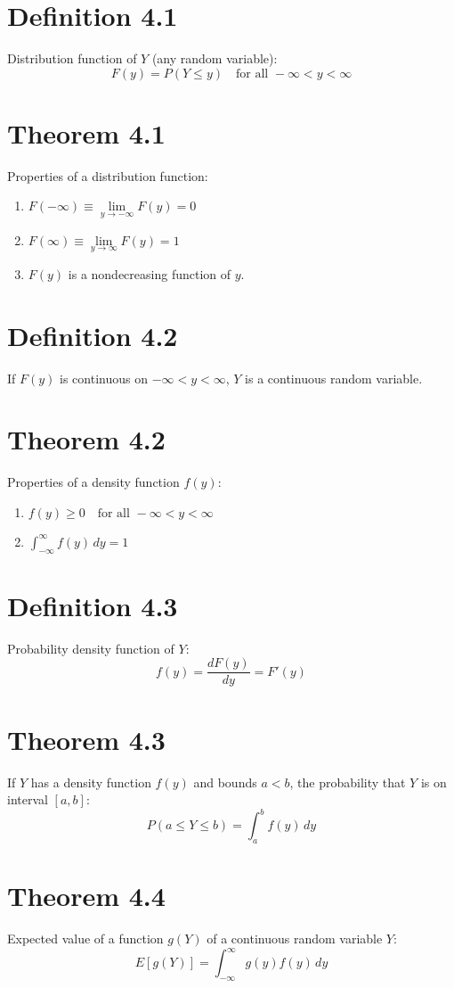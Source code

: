 \documentclass[12pt]{article}
\begin{document}
\section{Definition 4.1}
Distribution function of $Y$ (any random variable):
\[
F(y) = P(Y \leq y) \quad \text{for all } -\infty < y < \infty
\]

\section{Theorem 4.1}
Properties of a distribution function:
\begin{enumerate}
  \item $F(-\infty) \equiv \lim\limits_{y \to -\infty} F(y) = 0$
  \item $F(\infty) \equiv \lim\limits_{y \to \infty} F(y) = 1$
  \item $F(y)$ is a nondecreasing function of $y$.
\end{enumerate}

\section{Definition 4.2}
If $F(y)$ is continuous on $-\infty < y < \infty$, $Y$ is a continuous random variable.

\section{Theorem 4.2}
Properties of a density function $f(y)$:
\begin{enumerate}
  \item $f(y) \geq 0 \quad \text{for all } -\infty < y < \infty$
  \item $\int_{-\infty}^{\infty} f(y)\,dy = 1$
\end{enumerate}

\section{Definition 4.3}
Probability density function of $Y$:
\[
f(y) = \frac{dF(y)}{dy} = F'(y)
\]

\section{Theorem 4.3}
If $Y$ has a density function $f(y)$ and bounds $a < b$, the probability that $Y$ is on interval $[a, b]$:
\[
P(a \leq Y \leq b) = \int_a^b f(y)\,dy
\]

\section{Theorem 4.4}
Expected value of a function $g(Y)$ of a continuous random variable $Y$:
\[
E[g(Y)] = \int_{-\infty}^{\infty} g(y) f(y)\,dy
\]
\end{document}
